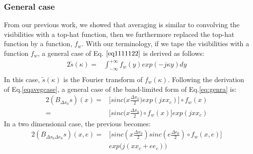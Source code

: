 \subsubsection{General case}
From our previous work, we showed that averaging is similar to convolving the visibilities with a top-hat function, then we 
furthermore replaced the top-hat function by a function, $f_w$. With our terminology, if we tape the visibilities with a function $f_w$, a 
general case of  Eq. $\ref{eq1111122}$ is derived as follows:
\begin{alignat}{2}
\tilde{s}(\kappa) =& \int_{-\infty}^{+\infty}f_{w}(y)exp(-j\kappa y)dy \label{eq:genral} \\
\end{alignat}
In this case, $\tilde{s}(\kappa)$ is the Fourier transform of $f_w(\kappa)$. Following the derivation of Eq.\ref{eqavegcase}, a general 
case of the band-limited form of Eq.\ref{eq:genra} is:
\begin{alignat*}{2}
(B_{\Delta x_0}s)(x) = & \bigg[sinc \big(x\frac{\Delta x_0}{2}\big) exp(jxx_c)\bigg]\circ f_w(x)\\
		     = & \bigg[sinc \big(x\frac{\Delta x_0}{2} \big)\circ f_w(x)\bigg]exp(jxx_c)
\end{alignat*}
In a two dimensional case, the previous becomes:
\begin{alignat*}{2}
(B_{\Delta x_0 \Delta e_0}s)(x,e)=&\bigg[sinc (x\frac{\Delta x_0}{2})sinc(e\frac{\Delta e_0}{2})\circ f_{w}(x,e)\bigg]\\
				  &exp\big(j (xx_c+ee_c)\big)
\end{alignat*}
